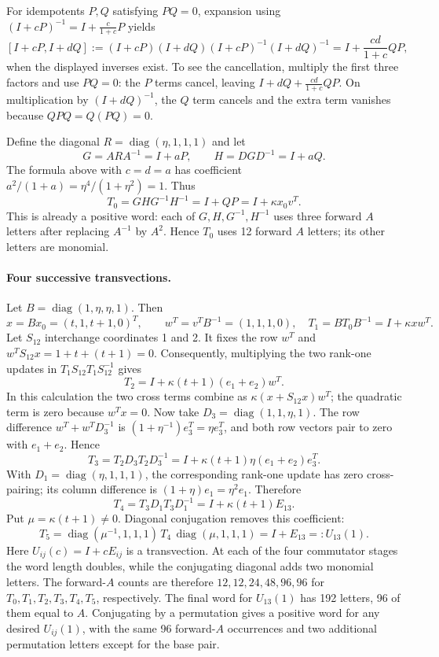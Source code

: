 For idempotents $P,Q$ satisfying $PQ=0$, expansion using
$(I+cP)^{-1}=I+\frac{c}{1+c}P$ yields
\[
 [I+cP,I+dQ]:=(I+cP)(I+dQ)(I+cP)^{-1}(I+dQ)^{-1}
      =I+\frac{cd}{1+c}QP,
\]
when the displayed inverses exist. To see the cancellation, multiply the
first three factors and use $PQ=0$: the $P$ terms cancel, leaving
$I+dQ+\frac{cd}{1+c}QP$. On multiplication by $(I+dQ)^{-1}$,
the $Q$ term cancels and the extra term vanishes because
$QPQ=Q(PQ)=0$.

Define the diagonal $R=\operatorname{diag}(\eta,1,1,1)$ and let
\[
 G=ARA^{-1}=I+aP,\qquad H=DGD^{-1}=I+aQ.
\]
The formula above with $c=d=a$ has coefficient
$a^2/(1+a)=\eta^4/(1+\eta^2)=1$. Thus
\[
 T_0=GHG^{-1}H^{-1}=I+QP=I+\kappa x_0v^T.
\]
This is already a positive word: each of $G,H,G^{-1},H^{-1}$ uses
three forward $A$ letters after replacing $A^{-1}$ by $A^2$. Hence
$T_0$ uses 12 forward $A$ letters; its other letters are monomial.

\paragraph{Four successive transvections.}
Let $B=\operatorname{diag}(1,\eta,\eta,1)$. Then
\[
 x=Bx_0=(t,1,t+1,0)^T,\qquad w^T=v^TB^{-1}=(1,1,1,0),
 \quad T_1=BT_0B^{-1}=I+\kappa xw^T.
\]
Let $S_{12}$ interchange coordinates 1 and 2. It fixes the row $w^T$
and $w^TS_{12}x=1+t+(t+1)=0$. Consequently, multiplying the two
rank-one updates in $T_1S_{12}T_1S_{12}^{-1}$ gives
\[
 T_2=I+\kappa(t+1)(e_1+e_2)w^T.
\]
In this calculation the two cross terms combine as
$\kappa (x+S_{12}x)w^T$; the quadratic term is zero because
$w^Tx=0$. Now take $D_3=\operatorname{diag}(1,1,\eta,1)$.
The row difference $w^T+w^TD_3^{-1}$ is
$(1+\eta^{-1})e_3^T=\eta e_3^T$, and both row vectors pair to zero
with $e_1+e_2$. Hence
\[
 T_3=T_2D_3T_2D_3^{-1}
    =I+\kappa(t+1)\eta(e_1+e_2)e_3^T.
\]
With $D_1=\operatorname{diag}(\eta,1,1,1)$, the corresponding
rank-one update has zero cross-pairing; its column difference is
$(1+\eta)e_1=\eta^2e_1$. Therefore
\[
 T_4=T_3D_1T_3D_1^{-1}
    =I+\kappa(t+1)E_{13}.
\]
Put $\mu=\kappa(t+1)\ne0$. Diagonal conjugation removes this
coefficient:
\[
 T_5=\operatorname{diag}(\mu^{-1},1,1,1)\,T_4\,
          \operatorname{diag}(\mu,1,1,1)
       =I+E_{13}=:U_{13}(1).
\]
Here $U_{ij}(c)=I+cE_{ij}$ is a transvection. At each of the four
commutator stages the word length doubles, while the conjugating diagonal
adds two monomial letters. The forward-$A$ counts are therefore
$12,12,24,48,96,96$ for $T_0,T_1,T_2,T_3,T_4,T_5$, respectively.
The final word for $U_{13}(1)$ has 192 letters, 96 of them equal to $A$.
Conjugating by a permutation gives a positive word for any desired
$U_{ij}(1)$, with the same 96 forward-$A$ occurrences and two additional
permutation letters except for the base pair.

